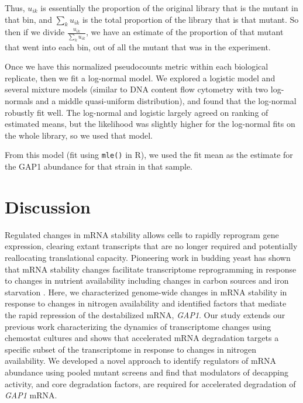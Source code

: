 Thus, \(u_{ik}\) is essentially the proportion of the
original library that is the mutant in that bin, and 
\(\sum_k u_{ik}\) is the total proportion of the library that is
that mutant.
So then if we divide \(\frac{u_{ik}}{\sum_k u_{ik}}\),
we have an estimate of the proportion of that mutant that
went into each bin, out of all the mutant that was in the experiment.

Once we have this normalized pseudocounts metric within each biological
replicate, then we fit a log-normal model. We explored a logistic model
and several mixture models (similar to DNA content flow cytometry with
two log-normals and a middle quasi-uniform distribution), and found that
the log-normal robustly fit well. The log-normal and logistic largely
agreed on ranking of estimated means, but the likelihood was slightly
higher for the log-normal fits on the whole library, so we used that
model.

From this model (fit using \texttt{mle()} in R), we used the fit 
mean as the estimate for the GAP1 abundance for that strain in that
sample.

\section{Discussion}

Regulated changes in mRNA stability allows cells to rapidly reprogram
gene expression, clearing extant transcripts that are no longer
required and potentially reallocating translational capacity.
Pioneering work in budding yeast has shown that mRNA
stability changes facilitate transcriptome reprogramming in response to
changes in nutrient availability including changes in carbon sources
\parencite{scheffler1998control} and iron starvation
\parencite{puig2005coordinated}. 
Here, we characterized genome-wide changes
in mRNA stability in response to changes in nitrogen availability and
identified factors that mediate the rapid repression of the
destabilized mRNA, \textit{GAP1}. Our study extends our previous work
characterizing the dynamics of transcriptome changes using chemostat
cultures \parencite{airoldi2016steady} and shows that accelerated mRNA
degradation targets a specific subset of the transcriptome in response
to changes in nitrogen availability. We developed a novel approach to
identify regulators of mRNA abundance using pooled mutant screens and
find that modulators of decapping activity, and core degradation
factors, are required for accelerated degradation of 
\textit{GAP1} mRNA. 
 
